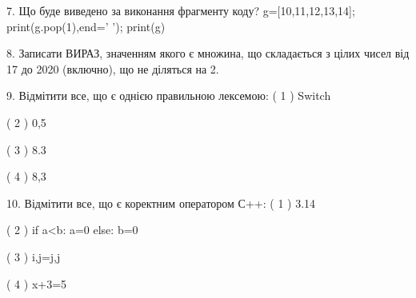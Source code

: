 \documentclass[11pt]{article}
\begin{document}
\vspace{5mm}

7. Що буде виведено за виконання фрагменту коду?
g=[10,11,12,13,14]; print(g.pop(1),end=' '); print(g)\vspace{5mm}

8. 
Записати ВИРАЗ, значенням якого є множина, що складається з цілих чисел від 17 до 2020 (включно), що не діляться на 2.\vspace{5mm}

9. %
Відмітити все, що є однією правильною лексемою:
( 1 ) Switch

( 2 ) 0,5

( 3 ) 8.3

( 4 ) 8,3
\vspace{5mm}

10. %
Відмітити все, що є коректним оператором С++:
( 1 ) 3.14%

( 2 ) if a<b: a=0 else: b=0

( 3 ) i,j=j,j

( 4 ) x+3=5
\vspace{5mm}

\newpage
\end{document}
